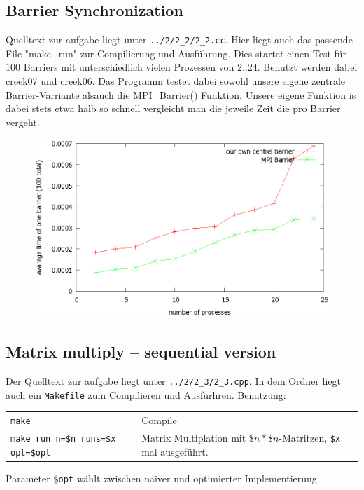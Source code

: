 \documentclass[a4paper,11pt]{scrartcl}
\begin{document}
\subsection{Barrier Synchronization}
Quelltext zur aufgabe liegt unter \verb+../2/2_2/2_2.cc+. Hier liegt auch das passende File "make+run" zur Compilierung und Ausführung. Dies startet einen Test für 100 Barriers mit unterschiedlich vielen Prozessen von 2..24. Benutzt werden dabei creek07 und creek06. Das Programm testet dabei sowohl unsere eigene zentrale Barrier-Varriante alsauch die MPI\_Barrier() Funktion. Unsere eigene Funktion is dabei stets etwa halb so schnell vergleicht man die jeweile Zeit die pro Barrier vergeht.

\begin{figure}[!ht]
\includegraphics[width=\linewidth,
keepaspectratio]{./2_2/bild.eps}
\centering
\end{figure}

\subsection{Matrix multiply – sequential version}

Der Quelltext zur aufgabe liegt unter \verb+../2/2_3/2_3.cpp+. In dem Ordner liegt auch ein \verb+Makefile+ zum Compilieren und Ausfürhren. Benutzung: 

\begin{table}[!ht]
    \begin{tabular}{ll}
    \verb+make+& Compile \\ 
    \verb+make run n=$n runs=$x opt=$opt+ & Matrix Multiplation mit $\$n*\$n$-Matritzen, \verb+$x+ mal ausgeführt. \\
    \end{tabular}
\end{table}
Parameter \verb+$opt+ wählt zwischen naiver und optimierter Implementierung.\\
\end{document}
